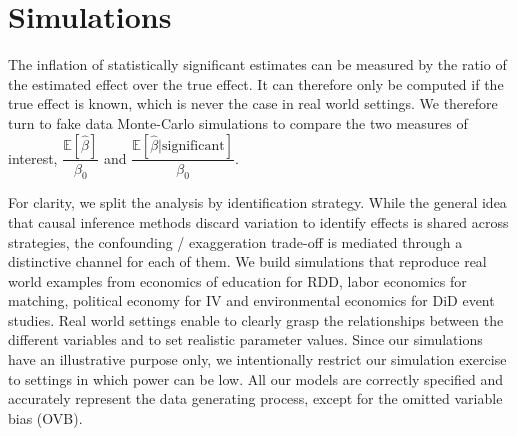 \documentclass[12pt]{article}
\begin{document}




\section{Simulations} \label{simulations}

    The inflation of statistically significant estimates can be measured by the ratio of the estimated effect over the true effect. It can therefore only be computed if the true effect is known, which is never the case in real world settings. We therefore turn to fake data Monte-Carlo simulations to compare the two measures of interest, $\dfrac{\mathbb{E}[\hat{\beta}]}{\beta_0}$ and $\dfrac{\mathbb{E}[\hat{\beta}| \text{significant}]}{\beta_0}$.
    
    For clarity, we split the analysis by identification strategy. While the general idea that causal inference methods discard variation to identify effects is shared across strategies, the confounding / exaggeration trade-off is mediated through a distinctive channel for each of them. We build simulations that reproduce real world examples from economics of education for RDD, labor economics for matching, political economy for IV and environmental economics for DiD event studies. Real world settings enable to clearly grasp the relationships between the different variables and to set realistic parameter values. Since our simulations have an illustrative purpose only, we intentionally restrict our simulation exercise to settings in which power can be low. All our models are correctly specified and accurately represent the data generating process, except for the omitted variable bias (OVB).
    

    
\end{document}
